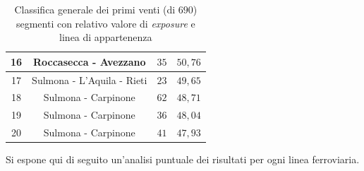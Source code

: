 \begin{table}[h]
\begin{tabular}{|c|c|c|c|}
16 & Roccasecca - Avezzano      & $35$        & $50,76$                     \\ \hline \rowcolor{flamingopink}
17 & Sulmona - L'Aquila - Rieti & $23$        & $49,65$                     \\ \hline \rowcolor{flamingopink}
18 & Sulmona - Carpinone        & $62$        & $48,71$                     \\ \hline \rowcolor{flamingopink}
19 & Sulmona - Carpinone        & $36$        & $48,04$                     \\ \hline \rowcolor{flamingopink}
20 & Sulmona - Carpinone        & $41$        & $47,93$                     \\ \hline 
\end{tabular}
\caption{Classifica generale dei primi venti (di $690$) segmenti con relativo valore di \textit{exposure} e linea di appartenenza}
\label{top20segmenti}
\end{table} 

Si espone qui di seguito un'analisi puntuale dei risultati per ogni linea ferroviaria.
 

